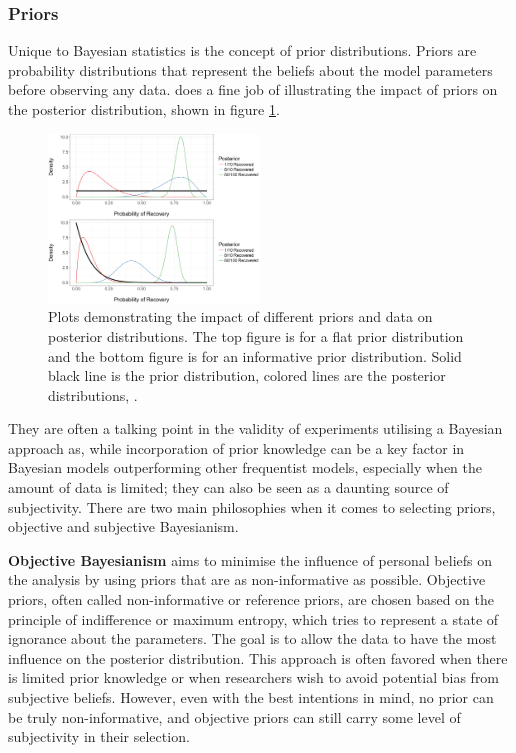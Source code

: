 \subsubsection{Priors}
Unique to Bayesian statistics is the concept of prior distributions. Priors are
probability distributions that represent the beliefs about the model parameters
before observing any data. \cite{clinical} does a fine job of illustrating the
impact of priors on the posterior distribution, shown in figure
\ref{fig:prior-impact}. 
\begin{figure}
  \begin{center}
    \includegraphics[width=0.5\textwidth]{../imgs/prior-impact.jpg}
  \end{center}
  \caption{Plots demonstrating the impact of different priors and data on posterior distributions. The top figure is for a flat prior distribution and the bottom figure is for an informative prior distribution. Solid black line is the prior distribution, colored lines are the posterior distributions, \cite{clinical}.}
  \label{fig:prior-impact}
\end{figure}
They are often a talking point in the validity of experiments utilising a
Bayesian approach as, while incorporation of prior knowledge can be a key
factor in Bayesian models outperforming other frequentist models, especially
when the amount of data is limited; they can also be seen as a daunting source
of subjectivity.
There are two main philosophies when it comes to selecting priors, objective
and subjective Bayesianism. 

\textbf{Objective Bayesianism} aims to minimise the influence of personal
beliefs on the analysis by using priors that are as non-informative as
possible. Objective priors, often called non-informative or reference priors,
are chosen based on the principle of indifference or maximum entropy, which
tries to represent a state of ignorance about the parameters. The goal is to
allow the data to have the most influence on the posterior distribution. This
approach is often favored when there is limited prior knowledge or when
researchers wish to avoid potential bias from subjective beliefs. However, even
with the best intentions in mind, no prior can be truly non-informative, and
objective priors can still carry some level of subjectivity in their selection.

